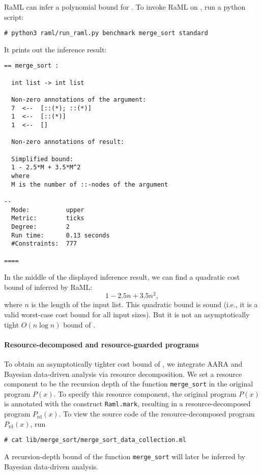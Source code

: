 RaML can infer a polynomial bound for \mergesort{}.
%
To invoke RaML on \mergesort{}, run a python script:
\begin{verbatim}
# python3 raml/run_raml.py benchmark merge_sort standard
\end{verbatim}
%
It prints out the inference result:
\begin{Verbatim}[fontsize=\footnotesize]
== merge_sort :

  int list -> int list

  Non-zero annotations of the argument:
  7  <--  [::(*); ::(*)]
  1  <--  [::(*)]
  1  <--  []

  Non-zero annotations of result:

  Simplified bound:
  1 - 2.5*M + 3.5*M^2
  where
  M is the number of ::-nodes of the argument

--
  Mode:          upper
  Metric:        ticks
  Degree:        2
  Run time:      0.13 seconds
  #Constraints:  777

====
\end{Verbatim}
%
In the middle of the displayed inference result, we can find a quadratic cost
bound of \mergesort{} inferred by RaML:
\begin{equation}
  1 - 2.5 n + 3.5 n^2,
\end{equation}
where $n$ is the length of the input list.
%
This quadratic bound is sound (i.e., it is a valid worst-case cost bound for all
input sizes).
%
But it is not an asymptotically tight $O(n \log n)$ bound of \mergesort{}.

\paragraph{Resource-decomposed and resource-guarded programs}

To obtain an asymptotically tighter cost bound of \mergesort{}, we integrate
AARA and Bayesian data-driven analysis via resource decomposition.
%
We set a resource component to be the recursion depth of the function
\texttt{merge\_sort} in the original program $P(x)$.
%
To specify this resource component, the original program $P(x)$ is annotated
with the construct \texttt{Raml.mark}, resulting in a resource-decomposed
program $P_{\mathrm{rd}}(x)$.
%
To view the source code of the resource-decomposed program $P_{\mathrm{rd}}(x)$,
run
\begin{verbatim}
# cat lib/merge_sort/merge_sort_data_collection.ml
\end{verbatim}
%
A recursion-depth bound of the function \texttt{merge\_sort} will later be
inferred by Bayesian data-driven analysis.

